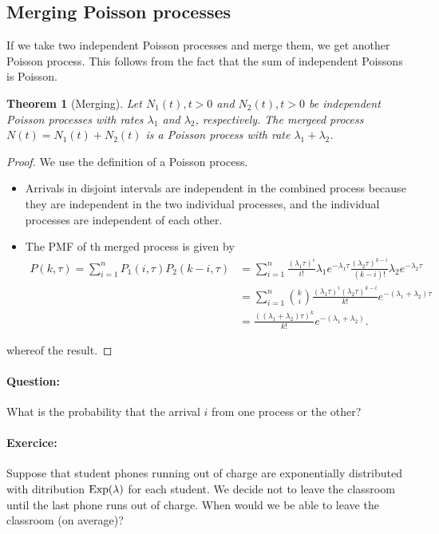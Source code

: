 \documentclass[12pt,a4paper]{article}
\newtheorem{theorem}{Theorem}
\begin{document}
\subsection{Merging Poisson processes}
If we take two independent Poisson processes and merge them, we get another Poisson process. 
This follows from the fact that the sum of independent Poissons is Poisson.
\begin{theorem}[Merging]
Let $N_1(t), t > 0$ and $N_2(t), t > 0$ be independent Poisson processes with rates $\lambda_1$ and $\lambda_2$, respectively. 
The mergeed process $N (t) = N_1(t) + N_2(t)$ is a Poisson process with rate $\lambda_1+\lambda_2$.
\end{theorem}
\begin{proof}
	We use the definition of a Poisson process. 
	\begin{itemize}
		\item Arrivals in disjoint intervals are independent in the combined process because
		they are independent in the two individual processes, and the individual processes are independent of each other. 
		\item The PMF of th merged process is given by
		\begin{equation}
			\begin{alignedat}{2}
				P(k,\tau) = \sum_{i=1}^n P_1(i,\tau)P_2(k-i,\tau)
				&= \sum_{i=1}^n \frac{(\lambda_1 \tau)^{i}}{i!}\lambda_1 e^{-\lambda_1 \tau} \frac{(\lambda_2 \tau)^{k-i}}{(k-i)!}\lambda_2 e^{-\lambda_2 \tau}\\
				&= \sum_{i=1}^n\binom{k}{i} \frac{(\lambda_1\tau)^i (\lambda_2\tau)^{k-i}}{k!}e^{-(\lambda_1+\lambda_2) \tau}\\
				&=  \frac{((\lambda_1+\lambda_2) \tau)^k}{k!} e^{-(\lambda_1+\lambda_2)}.
			\end{alignedat}
		\end{equation}
	\end{itemize}
	whereof the result.
	\end{proof}
\paragraph{Question:} What is the probability that the arrival $i$ from one process or the other?
\paragraph{Exercice:} Suppose that student phones running out of charge are exponentially distributed with ditribution ${\rm Exp}(\lambda)$ for each student. We decide not to leave the classroom until the last phone runs out of charge. When would we be able to leave the classroom (on average)?
\end{document}
